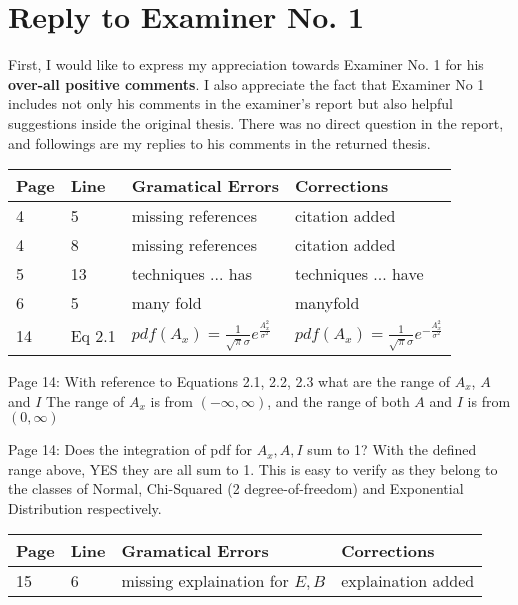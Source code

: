 \section*{Reply to Examiner No. 1}

\begin{replyheader}
\end{replyheader}  

First, I would like to express my appreciation towards Examiner No. 1 for his \textbf{over-all positive comments}.
I also appreciate the fact that Examiner No 1 includes
  not only his comments in the examiner's report
  but also helpful suggestions inside the original thesis.
There was no direct question in the report, and followings are my replies to his comments in the returned thesis.

\noindent
\begin{longtable}[c]{p{}|p{}|p{}|p{}}
\textbf{Page} & \textbf{Line} & \textbf{Gramatical Errors} & \textbf{Corrections} \\
 \hline
 \endhead
4 & 5 & missing references & citation added \\
4 & 8 & missing references & citation added \\
5 & 13 & techniques ... has & techniques ... have \\
6 & 5 & many fold & manyfold \\
14 & Eq 2.1 & $pdf(A_x)=\frac{1}{\sqrt{\pi}\sigma} e^{\frac{A_x^2}{\sigma^2}}$ & $pdf(A_x)=\frac{1}{\sqrt{\pi}\sigma} e^{-\frac{A_x^2}{\sigma^2}}$ \\
\end{longtable}    

\replyToComment
    {Page 14: With reference to Equations 2.1, 2.2, 2.3 what are the range of $A_x$, $A$ and $I$}
    {The range of $A_x$ is from $(-\infty, \infty)$, and the range of both $A$ and $I$ is from $(0,\infty)$} 

\replyToComment
  {Page 14: Does the integration of pdf for $A_x,A,I$ sum to 1?}
  {With the defined range above, YES they are all sum to 1. This is easy to verify as they belong to the classes of Normal, Chi-Squared (2 degree-of-freedom) and Exponential Distribution respectively.}

\noindent
\begin{longtable}[c]{p{}|p{}|p{}|p{}}
\textbf{Page} & \textbf{Line} & \textbf{Gramatical Errors} & \textbf{Corrections} \\
 \hline
 \endhead
15 & 6 & missing explaination for $E,B$ & explaination added \\
\end{longtable}    

